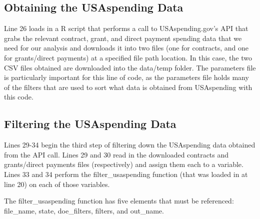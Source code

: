 \documentclass[
]{book}
\begin{document}
\hypertarget{obtaining-the-usaspending-data}{%
\subsection{Obtaining the USAspending Data}\label{obtaining-the-usaspending-data}}

Line 26 loads in a R script that performs a call to USAspending.gov's API that grabs the relevant contract, grant, and direct payment spending data that we need for our analysis and downloads it into two files (one for contracts, and one for grants/direct payments) at a specified file path location. In this case, the two CSV files obtained are downloaded into the data/temp folder. The parameters file is particularly important for this line of code, as the parameters file holds many of the filters that are used to sort what data is obtained from USAspending with this code.

\hypertarget{filtering-the-usaspending-data}{%
\subsection{Filtering the USAspending Data}\label{filtering-the-usaspending-data}}

Lines 29-34 begin the third step of filtering down the USAspending data obtained from the API call. Lines 29 and 30 read in the downloaded contracts and grants/direct payments files (respectively) and assign them each to a variable. Lines 33 and 34 perform the filter\_usaspending function (that was loaded in at line 20) on each of those variables.

The filter\_usaspending function has five elements that must be referenced: file\_name, state, doe\_filters, filters, and out\_name.
\end{document}
